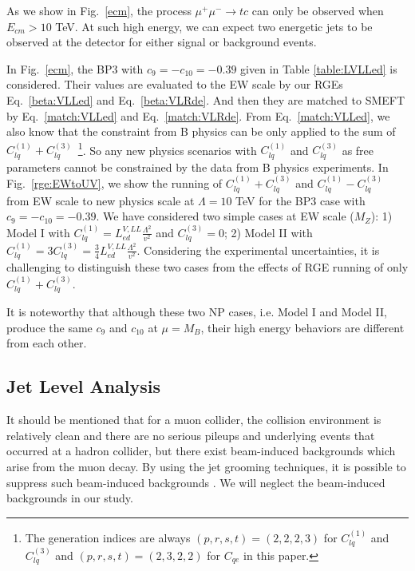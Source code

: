 \documentclass[a4paper,11pt]{article}
\begin{document}
As we show in Fig.~\ref{ecm}, the process $\mu^+\mu^-\to tc$ can only be observed when $E_{cm}>10$ TeV. 
At such high energy, we can expect two energetic jets to be observed at the detector for either signal or background events. 

In Fig.~\ref{ecm}, the BP3 with $c_{9}=-c_{10}=-0.39$ given in Table \ref{table:LVLLed} is considered.
Their values are evaluated to the EW scale by our RGEs Eq.~\ref{beta:VLLed} and Eq.~\ref{beta:VLRde}. 
And then they are matched to SMEFT by Eq.~\ref{match:VLLed} and Eq.~\ref{match:VLRde}. 
From Eq.~\ref{match:VLLed}, we also know that the constraint from B physics can be only applied to the sum of $C^{(1)}_{lq}+C^{(3)}_{lq}$~\footnote{The generation indices are always $(p,r,s,t)=(2,2,2,3)$ for $C^{(1)}_{lq}$ and $C^{(3)}_{lq}$ and $(p,r,s,t)=(2,3,2,2)$ for $C_{qe}$ in this paper.}.  
So any new physics scenarios with $C^{(1)}_{lq}$ and $C^{(3)}_{lq}$ as free parameters cannot be constrained by the data from B physics experiments. 
In Fig.~\ref{rge:EWtoUV}, we show the running of $C^{(1)}_{lq}+C^{(3)}_{lq}$ and $C^{(1)}_{lq}-C^{(3)}_{lq}$ from EW scale to new physics scale at $\Lambda=10$ TeV for the BP3 case with $c_{9}=-c_{10}=-0.39$.
We have considered two simple cases at EW scale ($M_Z$): 1)  Model I with $C^{(1)}_{lq}=L^{V,LL}_{ed} \frac{\Lambda^2}{v^2}$ and $C^{(3)}_{lq} = 0$; 2) Model II with $C^{(1)}_{lq}=3 C^{(3)}_{lq}=\frac{3}{4} L^{V,LL}_{ed} \frac{\Lambda^2}{v^2}$.
Considering the experimental uncertainties, it is challenging to distinguish these two cases from the effects of RGE running of only $C^{(1)}_{lq}+C^{(3)}_{lq}$. 

It is noteworthy that although these two NP cases, i.e. Model I and Model II, produce the same $c_9$ and $c_{10}$ at $\mu=M_B$, their high energy behaviors are different from each other. 

\subsection{Jet Level Analysis}

It should be mentioned that for a muon collider, 
the collision environment is relatively clean and there are no serious pileups and underlying events that occurred at a hadron collider, 
but there exist beam-induced backgrounds which arise from the muon decay. 
By using the jet grooming techniques, 
it is possible to suppress such beam-induced backgrounds \cite{Collamati:2021sbv}. 
 We will neglect the beam-induced backgrounds in our study.
\end{document}
